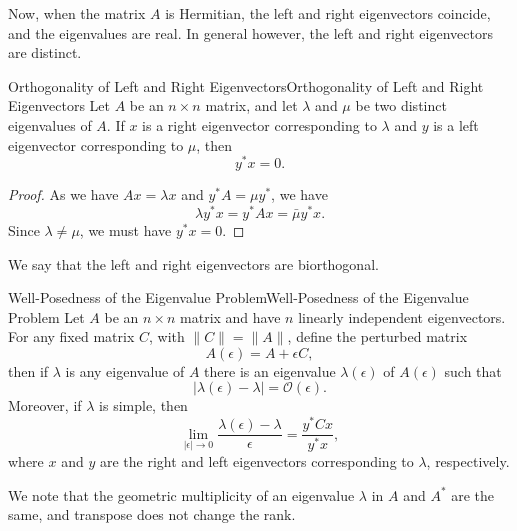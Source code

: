 \documentclass[../main.tex]{subfiles}
\begin{document}
Now, when the matrix $A$ is Hermitian, the left and right eigenvectors coincide, and the eigenvalues are real. In general however, the left and right eigenvectors are distinct.

\begin{lemma}{Orthogonality of Left and Right Eigenvectors}{Orthogonality of Left and Right Eigenvectors}
	Let $A$ be an $n \times n$ matrix, and let $\lambda$ and $\mu$ be two distinct eigenvalues of $A$. If $x$ is a right eigenvector corresponding to $\lambda$ and $y$ is a left eigenvector corresponding to $\mu$, then
	\begin{equation*}
		y^* x = 0.
	\end{equation*}
\end{lemma}
\begin{proof}
	As we have $Ax = \lambda x$ and $y^* A = \mu y^*$, we have
	\begin{equation*}
		\lambda y^* x = y^* A x = \bar{\mu} y^* x.
	\end{equation*}
	Since $\lambda \neq \mu$, we must have $y^* x = 0$.
\end{proof}
We say that the left and right eigenvectors are biorthogonal.

\begin{theorem}{Well-Posedness of the Eigenvalue Problem}{Well-Posedness of the Eigenvalue Problem}
	Let $A$ be an $n \times n$ matrix and have $n$ linearly independent eigenvectors. For any fixed matrix $C$, with $\|C\| = \|A\|$, define the perturbed matrix
	\begin{equation}
		A(\epsilon) = A + \epsilon C,
	\end{equation}
	then if $\lambda$ is any eigenvalue of $A$ there is an eigenvalue $\lambda(\epsilon)$ of $A(\epsilon)$ such that
	\begin{equation} \label{eq:well-posedness}
		|\lambda(\epsilon) - \lambda| = \mathcal{O}(\epsilon).
	\end{equation}
	Moreover, if $\lambda$ is simple, then
	\begin{equation}
		\lim_{|\epsilon| \to 0} \frac{\lambda(\epsilon) - \lambda}{\epsilon} = \frac{y^* C x}{y^* x},
	\end{equation}
	where $x$ and $y$ are the right and left eigenvectors corresponding to $\lambda$, respectively.
\end{theorem}
\begin{remark}
	We note that the geometric multiplicity of an eigenvalue $\lambda$ in $A$ and $A^*$ are the same, and transpose does not change the rank.
\end{remark}
\end{document}

